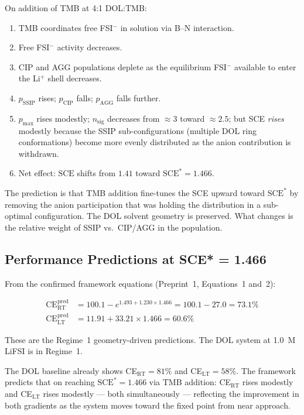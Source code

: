 \documentclass[11pt]{article}
\theoremstyle{plain}
\theoremstyle{definition}
\theoremstyle{remark}
\begin{document}
On addition of TMB at 4:1 DOL:TMB:
\begin{enumerate}[leftmargin=2em]
  \item TMB coordinates free FSI$^-$ in solution via B--N interaction.
  \item Free FSI$^-$ activity decreases.
  \item CIP and AGG populations deplete as the equilibrium
        FSI$^-$ available to enter the Li$^+$ shell decreases.
  \item $p_{\mathrm{SSIP}}$ rises; $p_{\mathrm{CIP}}$ falls;
        $p_{\mathrm{AGG}}$ falls further.
  \item $p_{\max}$ rises modestly; $n_{\mathrm{sig}}$ decreases
        from $\approx 3$ toward $\approx 2.5$; but SCE \emph{rises}
        modestly because the SSIP sub-configurations (multiple DOL
        ring conformations) become more evenly distributed as the
        anion contribution is withdrawn.
  \item Net effect: $\mathrm{SCE}$ shifts from $1.41$ toward
        $\mathrm{SCE}^{*} = 1.466$.
\end{enumerate}

The prediction is that TMB addition fine-tunes the SCE upward toward
$\mathrm{SCE}^{*}$ by removing the anion participation that was
holding the distribution in a sub-optimal configuration.  The DOL
solvent geometry is preserved.  What changes is the relative weight
of SSIP vs.\ CIP/AGG in the population.

\subsection{Performance Predictions at SCE* = 1.466}

From the confirmed framework equations (Preprint~1, Equations~1 and~2):

\begin{align}
  \mathrm{CE}_{\mathrm{RT}}^{\mathrm{pred}}
  &= 100.1 - e^{1.493 + 1.230 \times 1.466}
   = 100.1 - 27.0 = 73.1\%
  \label{eq:CE_RT_pred}\\[6pt]
  \mathrm{CE}_{\mathrm{LT}}^{\mathrm{pred}}
  &= 11.91 + 33.21 \times 1.466 = 60.6\%
  \label{eq:CE_LT_pred}
\end{align}

These are the Regime~1 geometry-driven predictions.  The DOL system at
1.0~M LiFSI is in Regime~1.

The DOL baseline already shows CE$_{\mathrm{RT}} = 81\%$ and
CE$_{\mathrm{LT}} = 58\%$.  The framework predicts that on reaching
$\mathrm{SCE}^{*} = 1.466$ via TMB addition:
CE$_{\mathrm{RT}}$ rises modestly and CE$_{\mathrm{LT}}$ rises
modestly --- both simultaneously --- reflecting the improvement in
both gradients as the system moves toward the fixed point from near
approach.
\end{document}
